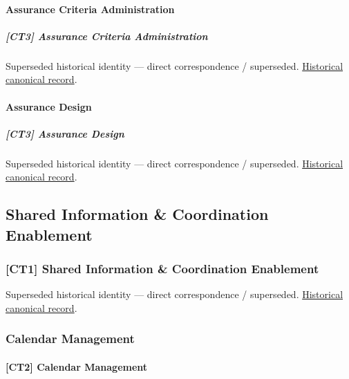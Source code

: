 \paragraph{Assurance Criteria Administration}

\subparagraph{[CT3] Assurance Criteria Administration}

\par\label{element:6dab08ab1e3249d7b314843ca9ed0149}
Superseded historical identity — direct correspondence / superseded. \href{../../../../continuum/strategy/capability/6dab08ab1e3249d7b314843ca9ed0149.md}{Historical canonical record}.\par

\paragraph{Assurance Design}

\subparagraph{[CT3] Assurance Design}

\par\label{element:e1b8db7c95fa4e7ea296351a03532e24}
Superseded historical identity — direct correspondence / superseded. \href{../../../../continuum/strategy/capability/e1b8db7c95fa4e7ea296351a03532e24.md}{Historical canonical record}.\par

\subsection{Shared Information \& Coordination Enablement}

\subsubsection{[CT1] Shared Information \& Coordination Enablement}

\par\label{element:eeabb9c3c526404cbe4302906560fa7e}
Superseded historical identity — direct correspondence / superseded. \href{../../../../continuum/strategy/capability/eeabb9c3c526404cbe4302906560fa7e.md}{Historical canonical record}.\par

\subsubsection{Calendar Management}

\paragraph{[CT2] Calendar Management}

